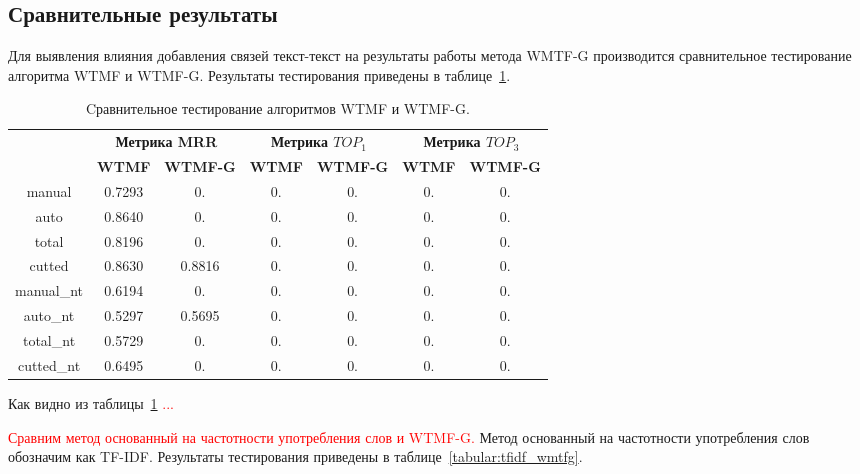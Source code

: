 \subsection{Сравнительные результаты}
    Для выявления влияния добавления связей текст-текст на результаты работы метода WMTF-G производится сравнительное тестирование алгоритма WTMF и WTMF-G.
    Результаты тестирования приведены в таблице~\ref{tabular:wtmf_wmtfg}.

    \begin{table}[h!]
    \caption{Cравнительное тестирование алгоритмов WTMF и WTMF-G. \bigskip}
    \centering

    \label{tabular:wtmf_wmtfg}
        \begin{tabular}{|c|c|c|c|c|c|c|}
            \hline
            \bf{\multirow{2}{*}{\specialcell{Набор данных}}} &
            \multicolumn{2}{|c|}{\bf{Метрика MRR}} &
            \multicolumn{2}{|c|}{\bf{Метрика $TOP_1$}} &
            \multicolumn{2}{|c|}{\bf{Метрика $TOP_3$}} \\ \cline{2-7}
            & \bf{WTMF} & \bf{WTMF-G} & \bf{WTMF} & \bf{WTMF-G} & \bf{WTMF} & \bf{WTMF-G} \\ \hline
            manual & 0.7293 & 0. & 0. & 0. & 0. & 0. \\ \hline
            auto & 0.8640 & 0. & 0. & 0. & 0. & 0. \\ \hline
            total & 0.8196 & 0. & 0. & 0. & 0. & 0. \\ \hline
            cutted & 0.8630 & 0.8816 & 0. & 0. & 0. & 0. \\ \hline
            manual\_nt & 0.6194 & 0. & 0. & 0. & 0. & 0. \\ \hline
            auto\_nt & 0.5297 & 0.5695 & 0. & 0. & 0. & 0. \\ \hline
            total\_nt & 0.5729 & 0. & 0. & 0. & 0. & 0. \\ \hline
            cutted\_nt & 0.6495 & 0. & 0. & 0. & 0. & 0. \\ \hline
        \end{tabular}
    \end{table}
    Как видно из таблицы~\ref{tabular:wtmf_wmtfg} \textcolor{red}{...}

    \textcolor{red}{Сравним метод основанный на частотности употребления слов и WTMF-G.}
    Метод основанный на частотности употребления слов обозначим как TF-IDF.
    Результаты тестирования приведены в таблице~\ref{tabular:tfidf_wmtfg}.

